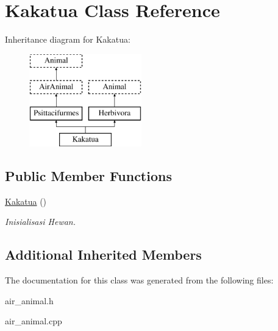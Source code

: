 \hypertarget{class_kakatua}{}\section{Kakatua Class Reference}
\label{class_kakatua}
Inheritance diagram for Kakatua\+:\begin{figure}[H]
\begin{center}
\leavevmode
\includegraphics[height=4.000000cm]{class_kakatua}
\end{center}
\end{figure}
\subsection*{Public Member Functions}
\begin{DoxyCompactItemize}
\item 
\hyperlink{class_kakatua_ac38dafb58986313ffdfdd2dda7c8e787}{Kakatua} ()\hypertarget{class_kakatua_ac38dafb58986313ffdfdd2dda7c8e787}{}\label{class_kakatua_ac38dafb58986313ffdfdd2dda7c8e787}

\begin{DoxyCompactList}\small\item\em Inisialisasi Hewan. \end{DoxyCompactList}\end{DoxyCompactItemize}
\subsection*{Additional Inherited Members}


The documentation for this class was generated from the following files\+:\begin{DoxyCompactItemize}
\item 
air\+\_\+animal.\+h\item 
air\+\_\+animal.\+cpp\end{DoxyCompactItemize}
